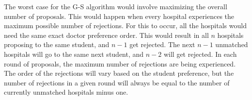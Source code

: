 \documentclass{hw_template}
\begin{document}
\begin{problem}
\begin{solution}
The worst case for the G-S algorithm would involve maximizing the overall number of proposals. This would happen when every hospital experiences the maximum 
possible number of rejections. For this to occur, all the hospitals would need the same exact doctor preference order. This would result in all $n$ hospitals proposing 
to the same student, and $n-1$ get rejected. The next $n-1$ unmatched hospitals will go to the same next student, and $n-2$ will get rejected. In each round of proposals, 
the maximum number of rejections are being experienced. The order of the rejections will vary based on the student preference, but the number of rejections in a given round 
will always be equal to the number of currently unmatched hospitals minus one.
\end{solution}

\end{problem}


\newpage
\end{document}
